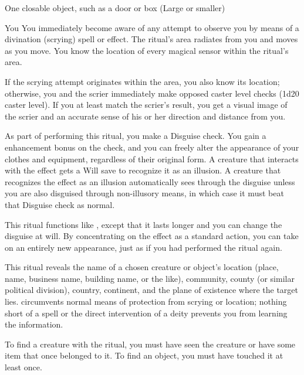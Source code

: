\begin{spelltarget}{One closable object, such as a door or box (Large or smaller)}
\begin{spelltarget}{You}
\spelldur{\durext}
\spelleffect You immediately become aware of any attempt to observe you by means of a divination (scrying) spell or effect. The ritual's area radiates from you and moves as you move. You know the location of every magical sensor within the ritual's area.
\par If the scrying attempt originates within the area, you also know its location; otherwise, you and the scrier immediately make opposed caster level checks (1d20 \add caster level). If you at least match the scrier's result, you get a visual image of the scrier and an accurate sense of his or her direction and distance from you.

\spelldur{\durlong \dismissable}
\spelleffect As part of performing this ritual, you make a Disguise check. You gain a  enhancement bonus on the check, and you can freely alter the appearance of your clothes and equipment, regardless of their original form.
\spellnotes A creature that interacts with the effect gets a Will save to recognize it as an illusion. A creature that recognizes the effect as an illusion automatically sees through the disguise unless you are also disguised through non-illusory means, in which case it must beat that Disguise check as normal.

\spelldur{\durext \dismissable}
\spelleffect This ritual functions like , except that it lasts longer and you can change the disguise at will. By concentrating on the effect as a standard action, you can take on an entirely new appearance, just as if you had performed the  ritual again.

\spelleffect This ritual reveals the name of a chosen creature or object's location (place, name, business name, building name, or the like), community, county (or similar political division), country, continent, and the plane of existence where the target lies.  circumvents normal means of protection from scrying or location; nothing short of a  spell or the direct intervention of a deity prevents you from learning the information.
\par To find a creature with the ritual, you must have seen the creature or have some item that once belonged to it. To find an object, you must have touched it at least once.


\end{spelltarget}
\end{spelltarget}
